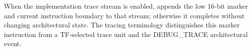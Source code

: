 When the implementation trace stream is enabled, appends the low 16-bit marker and current instruction boundary to that stream; otherwise it completes without changing architectural state. The tracing terminology distinguishes this marker instruction from a TF-selected trace unit and the DEBUG\_TRACE architectural event.
